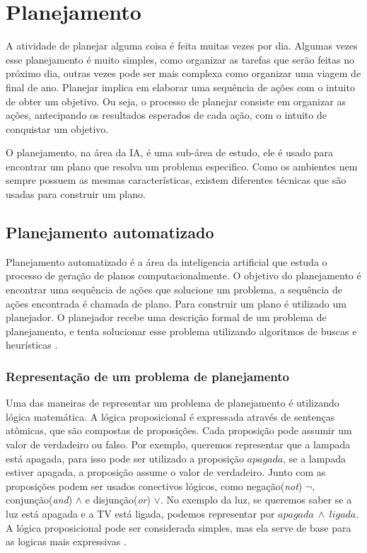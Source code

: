\chapter{\label{chap:planejamento}Planejamento}

A atividade de planejar alguma coisa é feita muitas vezes por dia. Algumas vezes esse planejamento é muito simples, como organizar as tarefas que serão feitas no próximo dia, outras vezes pode ser mais complexa como organizar uma viagem de final de ano. Planejar implica em elaborar uma sequência de ações com o intuito de obter um objetivo. Ou seja, o processo de planejar consiste em organizar as ações, antecipando os resultados esperados de cada ação, com o intuito de conquistar um objetivo. 

O planejamento, na área da IA, é uma sub-área de estudo, ele é usado para encontrar um plano que resolva um problema especifico. Como os ambientes nem sempre possuem as mesmas características, existem diferentes técnicas que são usadas para construir um plano.

\section{Planejamento automatizado}

Planejamento automatizado é a área da inteligencia artificial que estuda o processo de geração de planos computacionalmente. O objetivo do planejamento é encontrar uma sequência de ações que solucione um problema, a sequência de ações encontrada é chamada de plano. Para construir um plano é utilizado um planejador. O planejador recebe uma descrição formal de um problema de planejamento, e tenta solucionar esse problema utilizando algoritmos de buscas e heurísticas \cite{ghallab2004automated, intelligence2003modern}.   

\subsection{Representação de um problema de planejamento}

Uma das maneiras de representar um problema de planejamento é utilizando lógica matemática. A lógica proposicional é expressada através de sentenças atômicas, que são compostas de proposições. Cada proposição pode assumir um valor de verdadeiro ou falso. Por exemplo, queremos representar que a lampada está apagada, para isso pode ser utilizado a proposição $apagada$, se a lampada estiver apagada, a proposição assume o valor de verdadeiro. Junto com as proposições podem ser usados conectivos lógicos, como negação(\textit{not}) $\neg$, conjunção(\textit{and}) $\wedge$ e disjunção(\textit{or}) $\vee$. No exemplo da luz, se queremos saber se a luz está apagada e a TV está ligada, podemos representar por $apagada~ \wedge~ ligada$. A lógica proposicional pode ser considerada simples, mas ela serve de base para as logicas mais expressivas \cite{intelligence2003modern}. 

